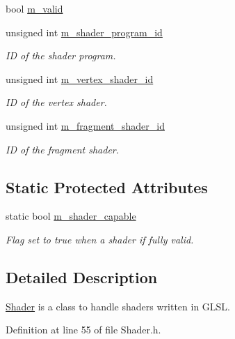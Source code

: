 \begin{DoxyCompactItemize}
bool \hyperlink{class_graphics_1_1_shader_a06900d31b8c7f91a1f2090156e0177c5}{m\_\-valid}
\item 
unsigned int \hyperlink{class_graphics_1_1_shader_ab648e2b9fcc45d291890836ee158fd02}{m\_\-shader\_\-program\_\-id}
\begin{DoxyCompactList}\small\item\em ID of the shader program. \end{DoxyCompactList}\item 
unsigned int \hyperlink{class_graphics_1_1_shader_ab74712775fe53e797ac9a6b0ed874785}{m\_\-vertex\_\-shader\_\-id}
\begin{DoxyCompactList}\small\item\em ID of the vertex shader. \end{DoxyCompactList}\item 
unsigned int \hyperlink{class_graphics_1_1_shader_a64e39abd7b7f12eba636e0ab9941b450}{m\_\-fragment\_\-shader\_\-id}
\begin{DoxyCompactList}\small\item\em ID of the fragment shader. \end{DoxyCompactList}\end{DoxyCompactItemize}
\subsection*{Static Protected Attributes}
\begin{DoxyCompactItemize}
\item 
static bool \hyperlink{class_graphics_1_1_shader_a2e7ae863654c0f94813ab51698740f99}{m\_\-shader\_\-capable}
\begin{DoxyCompactList}\small\item\em Flag set to true when a shader if fully valid. \end{DoxyCompactList}\end{DoxyCompactItemize}


\subsection{Detailed Description}
\hyperlink{class_graphics_1_1_shader}{Shader} is a class to handle shaders written in GLSL. 

Definition at line 55 of file Shader.h.



